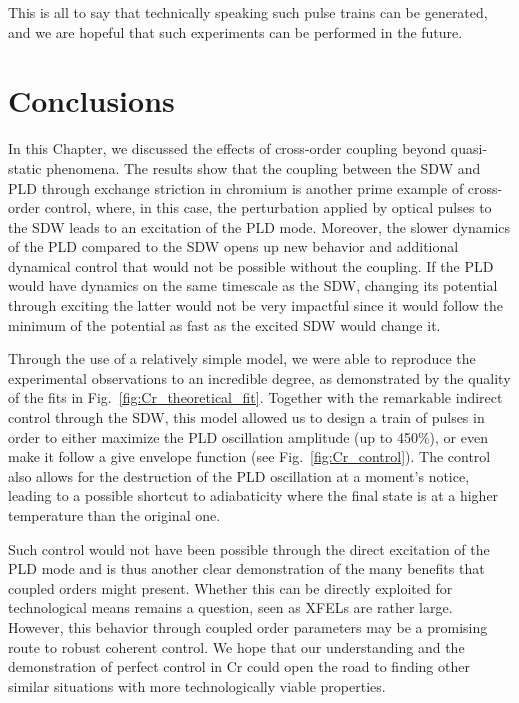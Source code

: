 This is all to say that technically speaking such pulse trains can be generated, and we are hopeful that such experiments can be performed in the future.

\section{Conclusions}
In this Chapter, we discussed the effects of cross-order coupling beyond quasi-static phenomena.
The results show that the coupling between the \gls{SDW} and \gls{PLD} through exchange striction in chromium is another prime example of cross-order control, where, in this case, the perturbation applied by optical pulses to the \gls{SDW} leads to an excitation of the \gls{PLD} mode.
Moreover, the slower dynamics of the \gls{PLD} compared to the \gls{SDW} opens up new behavior and additional dynamical control that would not be possible without the coupling.
If the \gls{PLD} would have dynamics on the same timescale as the \gls{SDW}, changing its potential through exciting the latter would not be very impactful since it would follow the minimum of the potential as fast as the excited \gls{SDW} would change it.

Through the use of a relatively simple model, we were able to reproduce the experimental observations to an incredible degree, as demonstrated by the quality of the fits in Fig.~\ref{fig:Cr_theoretical_fit}.
Together with the remarkable indirect control through the \gls{SDW}, this model allowed us to design a train of pulses in order to either maximize the \gls{PLD} oscillation amplitude (up to 450\%), or even make it follow a give envelope function (see Fig.~\ref{fig:Cr_control}).
The control also allows for the destruction of the \gls{PLD} oscillation at a moment's notice, leading to a possible shortcut to adiabaticity where the final state is at a higher temperature than the original one.

Such control would not have been possible through the direct excitation of the \gls{PLD} mode and is thus another clear demonstration of the many benefits that coupled orders might present.
Whether this can be directly exploited for technological means remains a question, seen as \glspl{XFEL} are rather large.
However, this behavior through coupled order parameters may be a promising route to robust coherent control.
We hope that our understanding and the demonstration of perfect control in Cr could open the road to finding other similar situations with more technologically viable properties.   
